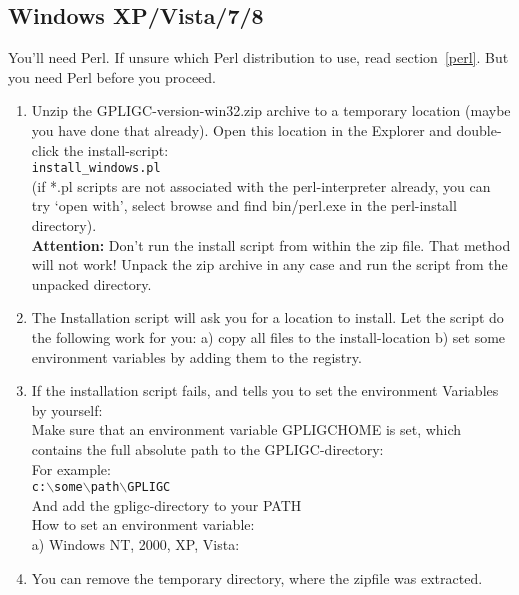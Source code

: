 \subsection{Windows XP/Vista/7/8}
\label{windows_install}


You'll need Perl. If unsure which Perl distribution to use, read section~\ref{perl}. But you need Perl before you proceed.

\begin{enumerate}

\item Unzip the GPLIGC-version-win32.zip archive to a temporary location
(maybe you have done that already).
Open this location in the Explorer and double-click the install-script: \\
\texttt{install\_windows.pl} \\
(if *.pl scripts are not associated with the perl-interpreter already,
you can try `open with', select browse and find bin/perl.exe in the
perl-install directory).\\
\textbf{Attention:} Don't run the install script from within the zip file. That method will not work!
Unpack the zip archive in any case and run the script from the unpacked directory.

\item The Installation script will ask you for a location to install.
Let the script do the following work for you:
a) copy all files to the install-location
b) set some environment variables by adding them to the registry.


\item If the installation script fails, and tells you to set the environment Variables
by yourself:\\
Make sure that an environment variable GPLIGCHOME is set,
which contains the full absolute path to the GPLIGC-directory:\\
For example: \\
\texttt{c:$\backslash$some$\backslash$path$\backslash$GPLIGC} \\
And add the gpligc-directory to your PATH \\
How to set an environment variable: \\
a) Windows NT, 2000, XP, Vista: \\


\item You can remove the temporary directory, where the zipfile was extracted.


\end{enumerate}
